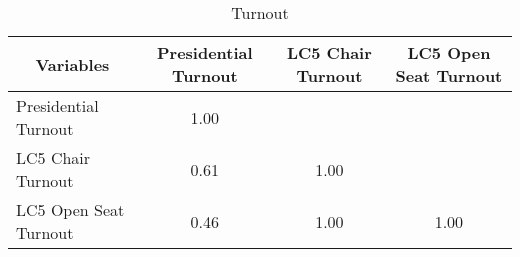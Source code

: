 \begin{table}[htbp]\centering \caption{Turnout\label{turnout_corr}}
\begin{tabular}{l  c  c  c }\hline\hline
\multicolumn{1}{c}{Variables} &Presidential Turnout&LC5 Chair Turnout&LC5 Open Seat Turnout\\ \hline
Presidential Turnout&1.00\\
LC5 Chair Turnout&0.61&1.00\\
LC5 Open Seat Turnout&0.46&1.00&1.00\\
\hline \hline 
 \end{tabular}
\end{table}

